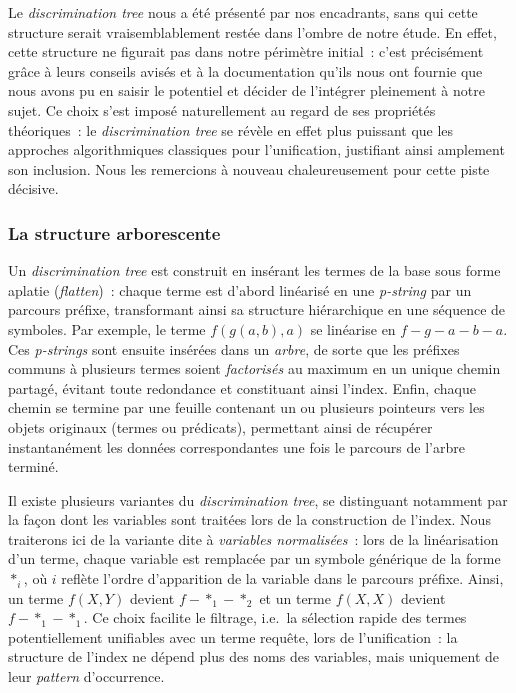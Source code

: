\documentclass[11pt]{article}
\begin{document}
\vspace{0.2cm}
Le \textit{discrimination tree} nous a été présenté par nos encadrants, sans qui cette structure serait vraisemblablement restée dans l'ombre de notre étude. En 
effet, cette structure ne figurait pas dans notre périmètre initial~: c'est précisément 
grâce à leurs conseils avisés et à la documentation qu'ils nous ont fournie que nous avons 
pu en saisir le potentiel et décider de l'intégrer pleinement à notre sujet. Ce choix 
s'est imposé naturellement au regard de ses propriétés théoriques~: le 
\textit{discrimination tree} se révèle en effet plus puissant que les approches 
algorithmiques classiques pour l'unification, justifiant ainsi amplement son inclusion. 
Nous les remercions à nouveau chaleureusement pour cette piste décisive.

\subsubsection{La structure arborescente}
    Un \textit{discrimination tree} est construit en insérant les termes de la 
    base sous forme aplatie (\textit{flatten})~: chaque terme est d'abord 
    linéarisé en une \textit{p-string} par un parcours préfixe, transformant ainsi 
    sa structure hiérarchique en une séquence de symboles. Par exemple, le terme $f(g(a, b), a)$ se 
    linéarise en $f-g-a-b-a$. Ces \textit{p-strings} 
    sont ensuite insérées dans un \textit{arbre}, de sorte que les préfixes communs 
    à plusieurs termes soient \textit{factorisés} au maximum en un unique chemin 
    partagé, évitant toute redondance et constituant ainsi l'index. Enfin, 
    chaque chemin se termine par une feuille contenant un ou plusieurs pointeurs 
    vers les objets originaux (termes ou prédicats), permettant ainsi de 
    récupérer instantanément les données correspondantes une fois le parcours 
    de l'arbre terminé.

    \vspace{0.2cm}
    Il existe plusieurs variantes du \textit{discrimination tree}, se distinguant 
    notamment par la façon dont les variables sont traitées lors de la construction 
    de l'index. Nous traiterons ici de la variante dite à \textit{variables 
    normalisées}~: lors de la linéarisation d'un terme, chaque variable est 
    remplacée par un symbole générique de la forme $*_i$, où $i$ reflète l'ordre 
    d'apparition de la variable dans le parcours préfixe. Ainsi, un terme 
    $f(X, Y)$ devient $f-{*_1}-{*_2}$ et un terme $f(X, X)$ 
    devient $f-{*_1}-{*_1}$. Ce choix facilite le filtrage, i.e.~la sélection rapide des termes potentiellement unifiables avec un terme requête, lors 
    de l'unification~: la structure de l'index ne dépend plus des noms des 
    variables, mais uniquement de leur \textit{pattern} d'occurrence.
\end{document}
